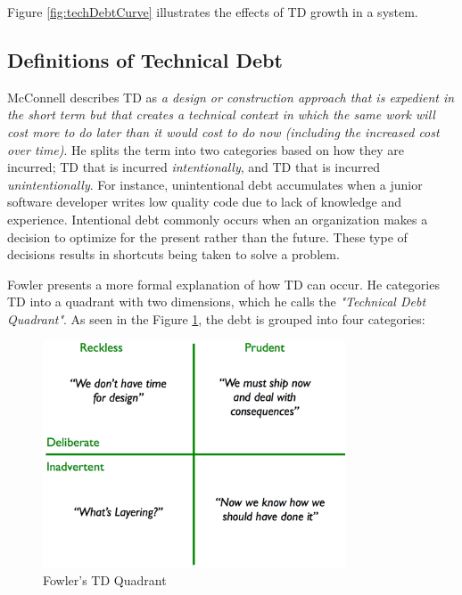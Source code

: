 Figure \ref{fig:techDebtCurve} illustrates the effects of TD growth in a system.


\subsection{Definitions of Technical Debt}
McConnell\cite{url-mcconnell} describes TD as \textit{a design or construction approach that is expedient in the short term but that creates a technical context in which the same work will cost more to do later than it would cost to do now (including the increased cost over time)}. He splits the term into two categories based on how they are incurred; TD that is incurred \textit{intentionally}, and TD that is incurred \textit{unintentionally}. For instance, unintentional debt accumulates when a junior software developer writes low quality code due to lack of knowledge and experience. Intentional debt commonly occurs when an organization makes a decision to optimize for the present rather than the future. These type of decisions results in shortcuts being taken to solve a problem.

Fowler\cite{url-fowler} presents a more formal explanation of how TD can occur. He categories TD into a quadrant with two dimensions, which he calls the \textit{"Technical Debt Quadrant"}. As seen in the Figure \ref{fig:techDebtQuad}, the debt is grouped into four categories: 

\begin{figure}[ht!]
	\centering
	\includegraphics[width=0.8\textwidth]{images/techDebtQuadrant.png}
	\caption{Fowler's TD Quadrant}
	\label{fig:techDebtQuad}
\end{figure}

